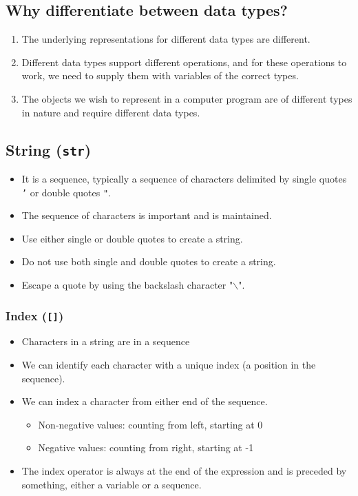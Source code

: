 \documentclass[11pt]{article}
\begin{document}
\subsection{Why differentiate between data types?}
\label{sec:org2f6c34b}
\begin{enumerate}
\item The underlying representations for different data types are different.
\item Different data types support different operations, and for these operations to work, we need to supply them with variables of the correct types.
\item The objects we wish to represent in a computer program are of different types in nature and require different data types.
\end{enumerate}

\subsection{String (\texttt{str})}
\label{sec:org70e353d}
\begin{itemize}
\item It is a sequence, typically a sequence of characters delimited by single quotes \texttt{'} or double quotes \texttt{"}.
\item The sequence of characters is important and is maintained.
\item Use either single or double quotes to create a string.
\item Do not use both single and double quotes to create a string.
\item Escape a quote by using the backslash character "$\backslash$".
\end{itemize}

 \newpage

\subsubsection{Index (\texttt{[]})}
\label{sec:org066e061}
\begin{itemize}
\item Characters in a string are in a sequence
\item We can identify each character with a unique index (a position in the sequence).
\item We can index a character from either end of the sequence.
\begin{itemize}
\item Non-negative values: counting from left, starting at 0
\item Negative values: counting from right, starting at -1
\end{itemize}
\item The index operator is always at the end of the expression and is preceded by something, either a variable or a sequence.
\end{itemize}
\end{document}
